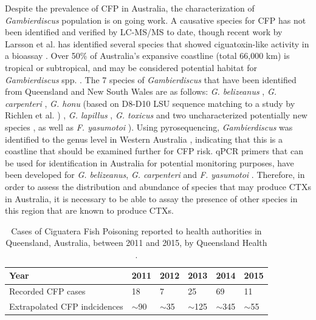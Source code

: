 \documentclass[12pt]{article}
\begin{document}
Despite the prevalence of CFP in Australia, the characterization of \textit{Gambierdiscus} population is on going work. 
A causative species for CFP has not been identified and verified by LC-MS/MS to date, though recent work by Larsson et al. has identified several species that showed ciguatoxin-like activity in a bioassay \cite{larsson2018toxicology}.
Over 50\% of Australia's expansive coastline (total 66,000 km) is tropical or subtropical, and may be considered potential habitat for \emph{Gambierdiscus} spp. \citep{kretzschmar2017characterization}. 
The 7 species of \emph{Gambierdiscus} that have been identified from Queensland and New South Wales are as follows: \emph{G. belizeanus} \citep{murray2014molecular}, \emph{G. carpenteri} \citep{kohli2014high,sparrow2017effects}, \emph{G. honu} (based on D8-D10 LSU sequence matching to a study by Richlen et al. \cite{richlen2008phylogeography}) \citep{rhodes2017new}, \emph{G. lapillus} \citep{kretzschmar2017characterization,larsson2018toxicology}, \emph{G. toxicus} \citep{hallegraeff2010algae} and two uncharacterized potentially new species \cite{larsson2018toxicology}, as well as \emph{F. yasumotoi}  \citep{murray2014molecular}). 
Using pyrosequencing, \textit{Gambierdiscus} was identified to the genus level in Western Australia \citep{kohli2014cob}, indicating that this is a coastline that should be examined further for CFP risk. 
qPCR primers that can be used for identification in Australia for potential monitoring purposes, have been developed for \emph{G. belizeanus}, \emph{G. carpenteri} and \emph{F. yasumotoi} \citep{nishimura2016quantitative,vandersea2012development}. 
Therefore, in order to assess the distribution and abundance of species that may produce CTXs in Australia, it is necessary to be able to assay the presence of other species in this region that are known to produce CTXs.\\ 
\begin{table}
\caption{Cases of Ciguatera Fish Poisoning reported to health authorities in Queensland, Australia, between 2011 and 2015, by Queensland Health \citep{qldcig}.}
\label{tbl:CFPTable}
\begin{tabular}{ | p{6cm} | p{1.5cm} | p{1.5cm}| p{1.5cm} | p{1.5cm} | p{1.5cm} | }
\hline
Year &2011&2012&2013&2014&2015\\
\hline
Recorded CFP cases&18&7&25&69&11\\
\hline
Extrapolated CFP indcidences&$\sim$90&$\sim$35&$\sim$125&$\sim$345&$\sim$55\\
\hline
\end{tabular}
\end{table}
\FloatBarrier
\end{document}
